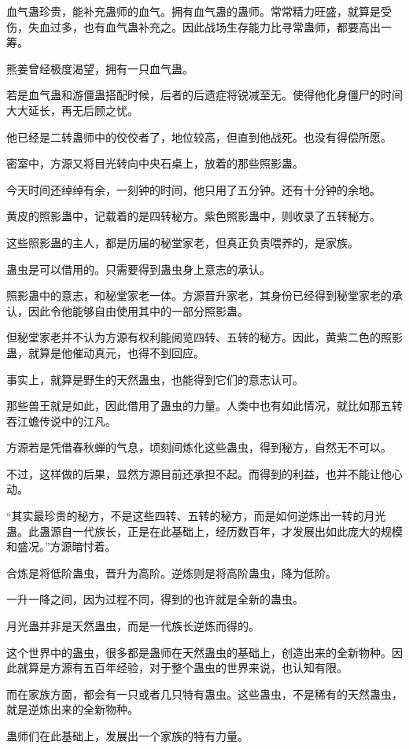 \begin{this_body}
血气蛊珍贵，能补充蛊师的血气。拥有血气蛊的蛊师。常常精力旺盛，就算是受伤，失血过多，也有血气蛊补充之。因此战场生存能力比寻常蛊师，都要高出一筹。

熊姜曾经极度渴望，拥有一只血气蛊。

若是血气蛊和游僵蛊搭配时候，后者的后遗症将锐减至无。使得他化身僵尸的时间大大延长，再无后顾之忧。

他已经是二转蛊师中的佼佼者了，地位较高，但直到他战死。也没有得偿所愿。

密室中，方源又将目光转向中央石桌上，放着的那些照影蛊。

今天时间还绰绰有余，一刻钟的时间，他只用了五分钟。还有十分钟的余地。

黄皮的照影蛊中，记载着的是四转秘方。紫色照影蛊中，则收录了五转秘方。

这些照影蛊的主人，都是历届的秘堂家老，但真正负责喂养的，是家族。

蛊虫是可以借用的。只需要得到蛊虫身上意志的承认。

照影蛊中的意志，和秘堂家老一体。方源晋升家老，其身份已经得到秘堂家老的承认，因此令他能够自由使用其中的一部分照影蛊。

但秘堂家老并不认为方源有权利能阅览四转、五转的秘方。因此，黄紫二色的照影蛊，就算是他催动真元，也得不到回应。

事实上，就算是野生的天然蛊虫，也能得到它们的意志认可。

那些兽王就是如此，因此借用了蛊虫的力量。人类中也有如此情况，就比如那五转吞江蟾传说中的江凡。

方源若是凭借春秋蝉的气息，顷刻间炼化这些蛊虫，得到秘方，自然无不可以。

不过，这样做的后果，显然方源目前还承担不起。而得到的利益，也并不能让他心动。

“其实最珍贵的秘方，不是这些四转、五转的秘方，而是如何逆炼出一转的月光蛊。此蛊源自一代族长，正是在此基础上，经历数百年，才发展出如此庞大的规模和盛况。”方源暗忖着。

合炼是将低阶蛊虫，晋升为高阶。逆炼则是将高阶蛊虫，降为低阶。

一升一降之间，因为过程不同，得到的也许就是全新的蛊虫。

月光蛊并非是天然蛊虫，而是一代族长逆炼而得的。

这个世界中的蛊虫，很多都是蛊师在天然蛊虫的基础上，创造出来的全新物种。因此就算是方源有五百年经验，对于整个蛊虫的世界来说，也认知有限。

而在家族方面，都会有一只或者几只特有蛊虫。这些蛊虫，不是稀有的天然蛊虫，就是逆炼出来的全新物种。

蛊师们在此基础上，发展出一个家族的特有力量。


\end{this_body}
